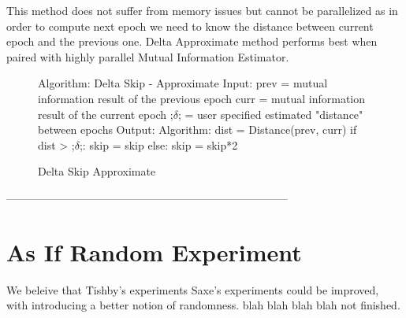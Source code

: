   This method does not suffer from memory issues but cannot be parallelized as
  in order to compute next epoch we need to know the distance between current
  epoch and the previous one. Delta Approximate method performs best when paired
  with highly parallel Mutual Information Estimator.

\begin{figure}[H]
    \begin{pythonfigure}
      Algorithm: Delta Skip - Approximate
      Input:
      prev = mutual information result of the previous epoch
      curr = mutual information result of the current epoch
      ;$\delta$; = user specified estimated "distance" between epochs
      Output:
      Algorithm:
      dist = Distance(prev, curr)
      if dist > ;$\delta$;:
        skip = skip
      else:
        skip = skip*2
    \end{pythonfigure}
    \caption{Delta Skip Approximate}
    \label{fig:deltaapprox}
\end{figure}

-----------------------------------------------------------------------------

\section{As If Random Experiment}

We beleive that Tishby's experiments Saxe's experiments could be improved, with
introducing a better notion of randomness. blah blah blah blah not finished.
